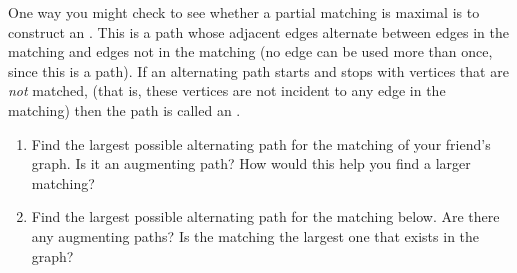 \documentclass{book}
\begin{document}
\setcounter{project}{59}
\addtocounter{project}{-1}
\begin{activity}[]\label{activity-52}
\hypertarget{p-464}{}%
One way you might check to see whether a partial matching is maximal is to construct an . This is a path whose adjacent edges alternate between edges in the matching and edges not in the matching (no edge can be used more than once, since this is a path). If an alternating path starts and stops with vertices that are \emph{not} matched, (that is, these vertices are not incident to any edge in the matching) then the path is called an .%
\begin{enumerate}[font=\bfseries,label=(\alph*),ref=\alph*]
\item\label{task-63} \hypertarget{p-465}{}%
Find the largest possible alternating path for the matching of your friend's graph.  Is it an augmenting path?  How would this help you find a larger matching?%
\begin{sidebyside}{1}{0.3}{0.3}{0}
\begin{sbspanel}{0.4}
\end{sbspanel}
\end{sidebyside}
\item\label{task-64} \hypertarget{p-466}{}%
Find the largest possible alternating path for the matching below.  Are there any augmenting paths?  Is the matching the largest one that exists in the graph?%
\begin{sidebyside}{1}{0.25}{0.25}{0}
\begin{sbspanel}{0.5}
\end{sbspanel}
\end{sidebyside}
\end{enumerate}
\end{activity}

\clearpage
\end{document}
